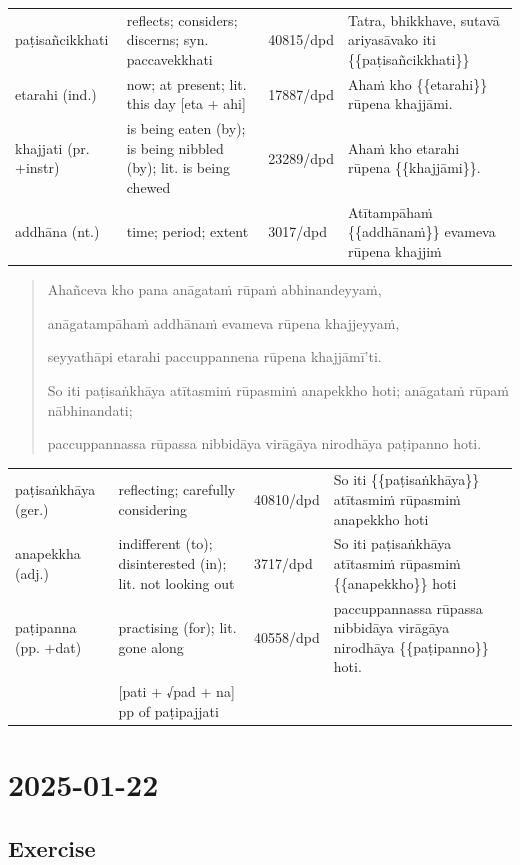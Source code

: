 \documentclass[11pt,oneside]{memoir}
\begin{document}
\begin{longtable}{L{\colOne} L{\colTwo} H H}
paṭisañcikkhati & reflects; considers; discerns; syn. paccavekkhati & 40815/dpd & Tatra, bhikkhave, sutavā ariyasāvako iti \{\{paṭisañcikkhati\}\}\\[0pt]
etarahi (ind.) & now; at present; lit. this day [eta + ahi] & 17887/dpd & Ahaṁ kho \{\{etarahi\}\} rūpena khajjāmi.\\[0pt]
khajjati (pr. +instr) & is being eaten (by); is being nibbled (by); lit. is being chewed & 23289/dpd & Ahaṁ kho etarahi rūpena \{\{khajjāmi\}\}.\\[0pt]
addhāna (nt.) & time; period; extent & 3017/dpd & Atītampāhaṁ \{\{addhānaṁ\}\} evameva rūpena khajjiṁ\\[0pt]
\end{longtable}

\begin{quote}
Ahañceva kho pana anāgataṁ rūpaṁ abhinandeyyaṁ,

anāgatampāhaṁ addhānaṁ evameva rūpena khajjeyyaṁ,

seyyathāpi etarahi paccuppannena rūpena khajjāmī’ti.

So iti paṭisaṅkhāya atītasmiṁ rūpasmiṁ anapekkho hoti; anāgataṁ rūpaṁ nābhinandati;

paccuppannassa rūpassa nibbidāya virāgāya nirodhāya paṭipanno hoti.
\end{quote}

\begin{longtable}{L{\colOne} L{\colTwo} H H}
paṭisaṅkhāya (ger.) & reflecting; carefully considering & 40810/dpd & So iti \{\{paṭisaṅkhāya\}\} atītasmiṁ rūpasmiṁ anapekkho hoti\\[0pt]
anapekkha (adj.) & indifferent (to); disinterested (in); lit. not looking out & 3717/dpd & So iti paṭisaṅkhāya atītasmiṁ rūpasmiṁ \{\{anapekkho\}\} hoti\\[0pt]
paṭipanna (pp. +dat) & practising (for); lit. gone along & 40558/dpd & paccuppannassa rūpassa nibbidāya virāgāya nirodhāya \{\{paṭipanno\}\} hoti.\\[0pt]
 & [pati + √pad + na] pp of paṭipajjati &  & \\[0pt]
\end{longtable}

\chapter{2025-01-22}
\label{sec:org8362474}
\section{Exercise}
\label{sec:org8124eaf}
\end{document}
